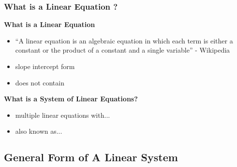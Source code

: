 \documentclass[fleqn]{beamer} %
\newcommand{\sectionIsubsectionItitle}{What is a Linear Equation ?}
\newcommand{\sectionIsubsectionIItitle}{General Form of  A Linear System}
\begin{document}
			\begin{frame}
				\frametitle{\sectionIsubsectionItitle}
				\bigskip

				\textbf{What is a Linear Equation}

				\begin{itemize}
					\item ``A linear equation is an algebraic equation in which each term is either a constant or the product of a constant and a single variable'' - Wikipedia \vspace{3mm}\\
					\item slope intercept form	\vspace{3mm}\\
					\item does not contain \vspace{3mm}\\
				\end{itemize}	

				\textbf{ What is a System of Linear Equations?}
				\begin{itemize}
					\item multiple linear equations with... \vspace{3mm}\\
					\item also known as... \vspace{3mm}\\		
				\end{itemize}

				\btVFill
			\end{frame}

		\subsection{\sectionIsubsectionIItitle}\label{sectionIsubsectionII}
\end{document}
